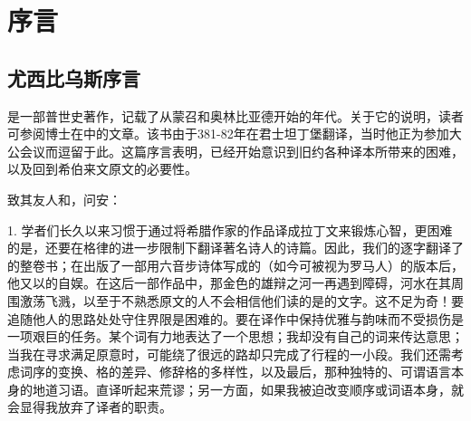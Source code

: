 
\chapter{序言}



\section{尤西比乌斯序言}

是一部普世史著作，记载了从蒙召和奥林比亚德开始的年代。关于它的说明，读者可参阅博士在中的文章。该书由于381-82年在君士坦丁堡翻译，当时他正为参加大公会议而逗留于此。这篇序言表明，已经开始意识到旧约各种译本所带来的困难，以及回到希伯来文原文的必要性。\par

致其友人和，问安：\par

1. 学者们长久以来习惯于通过将希腊作家的作品译成拉丁文来锻炼心智，更困难的是，还要在格律的进一步限制下翻译著名诗人的诗篇。因此，我们的逐字翻译了的整卷书；在出版了一部用六音步诗体写成的（如今可被视为罗马人）的版本后，他又以的自娱。在这后一部作品中，那金色的雄辩之河一再遇到障碍，河水在其周围激荡飞溅，以至于不熟悉原文的人不会相信他们读的是的文字。这不足为奇！要追随他人的思路处处守住界限是困难的。要在译作中保持优雅与韵味而不受损伤是一项艰巨的任务。某个词有力地表达了一个思想；我却没有自己的词来传达意思；当我在寻求满足原意时，可能绕了很远的路却只完成了行程的一小段。我们还需考虑词序的变换、格的差异、修辞格的多样性，以及最后，那种独特的、可谓语言本身的地道习语。直译听起来荒谬；另一方面，如果我被迫改变顺序或词语本身，就会显得我放弃了译者的职责。\par

